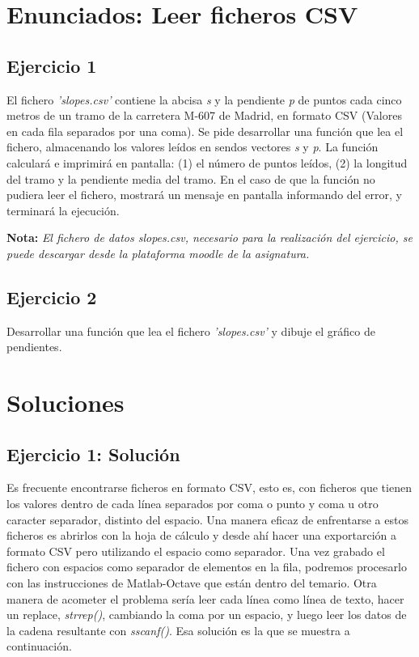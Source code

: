 \documentclass[a4paper,10pt, oneside]{article}
\begin{document}
\section{Enunciados: Leer ficheros CSV}

\subsection{Ejercicio 1}

El fichero \textit{'slopes.csv'} contiene la abcisa \textit{s} y la pendiente \textit{p} de puntos cada cinco metros de un tramo de la carretera M-607 de Madrid, en formato CSV (Valores en cada fila separados por una coma). Se pide desarrollar una función que lea el fichero, almacenando los valores leídos en sendos vectores \textit{s} y \textit{p}. La función calculará e imprimirá en pantalla: (1) el número de puntos leídos, (2) la longitud del tramo y la pendiente media del tramo. En el caso de que la función no pudiera leer el fichero, mostrará un mensaje en pantalla informando del error, y terminará la ejecución.

\textbf{Nota:} \textit{El fichero de datos \textit{slopes.csv}, necesario para la realización del ejercicio, se puede descargar desde la plataforma moodle de la asignatura.}
 

\subsection{Ejercicio 2}

Desarrollar una función que lea el fichero \textit{'slopes.csv'} y dibuje el gráfico de pendientes. 

\section{Soluciones}

\subsection{Ejercicio 1: Solución}

Es frecuente encontrarse ficheros en formato CSV, esto es, con ficheros que tienen los valores dentro de cada línea separados por coma o punto y coma u otro caracter separador, distinto del espacio. Una manera eficaz de enfrentarse a estos ficheros es abrirlos con la hoja de cálculo y desde ahí hacer una exportarción a formato CSV pero utilizando el espacio como separador. Una vez grabado el fichero con espacios como separador de elementos en la fila, podremos procesarlo con las instrucciones de Matlab-Octave que están dentro del temario. Otra manera de acometer el problema sería leer cada línea como línea de texto, hacer un replace, \textit{strrep()}, cambiando la coma por un espacio, y luego leer los datos de la cadena resultante con \textit{sscanf()}. Esa solución es la que se muestra a continuación. 
\end{document}
